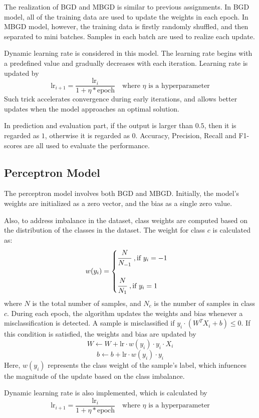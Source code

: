 \documentclass{article}
\begin{document}
The realization of BGD and MBGD is similar to previous assignments. In BGD model, 
all of the training data are used to update the weights in each epoch.
In MBGD model, however, the training data is firstly randomly shuffled, and then 
separated to mini batches. Samples in each batch are used to realize each update.

Dynamic learning rate is considered in this model. The learning rate begins with a
predefined value and gradually decreases with each iteration. Learning rate is updated
by
$$
\text{lr}_{i+1}=\frac{\text{lr}_i}{1+\eta*\text{epoch}} \quad \text{where }\eta\text{ is a hyperparameter}
$$
Such trick accelerates convergence during early iterations, and allows better updates 
when the model approaches an optimal solution.

In prediction and evaluation part, if the output is larger than $0.5$, then it is regarded
as $1$, otherwise it is regarded as $0$. Accuracy, Precision, Recall and F1-scores are
all used to evaluate the performance.

\subsection{Perceptron Model}

The perceptron model involves both BGD and MBGD. Initially, the model's weights are initialized as a zero vector, and the bias
as a single zero value.

Also, to address imbalance in the dataset, class weights are computed based on the
distribution of the classes in the dataset. The weight for class $c$ is calculated as:
$$
w(y_i)=\begin{cases}
    \cfrac{N}{N_{-1}}\ , \text{if}\  y_i=-1\\ \\
    \cfrac{N}{N_1}\ , \text{if}\  y_i=1
\end{cases}
$$
where $N$ is the total number of samples, and $N_c$ is the number of samples in class $c$.
During each epoch, the algorithm updates the weights and bias whenever a misclassification
is detected. A sample is misclassified if $y_i\cdot(W^T X_i+b)\le 0$. If this
condition is satisfied, the weights and bias are updated by
$$
W\leftarrow W+\text{lr}\cdot w(y_i)\cdot y_i \cdot X_i
$$
$$
b\leftarrow b+\text{lr}\cdot w(y_i)\cdot y_i
$$
Here, $w(y_i)$ represents the class weight of the sample's label, which infuences the 
magnitude of the update based on the class imbalance.

Dynamic learning rate is also implemented, which is calculated by
$$
\text{lr}_{i+1}=\frac{\text{lr}_i}{1+\eta*\text{epoch}} \quad \text{where }\eta\text{ is a hyperparameter}
$$
\end{document}
